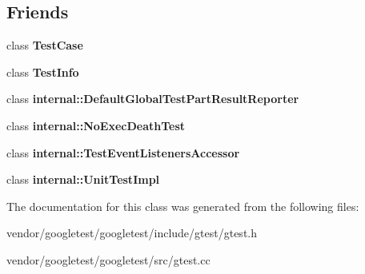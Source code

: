\subsection*{Friends}
\begin{DoxyCompactItemize}
\item 
\mbox{\label{classtesting_1_1_test_event_listeners_aff779e55b06adfa7c0088bd10253f0f0}} 
class {\bfseries Test\+Case}
\item 
\mbox{\label{classtesting_1_1_test_event_listeners_a4c49c2cdb6c328e6b709b4542f23de3c}} 
class {\bfseries Test\+Info}
\item 
\mbox{\label{classtesting_1_1_test_event_listeners_abae39633da9932847b41cb80efd62115}} 
class {\bfseries internal\+::\+Default\+Global\+Test\+Part\+Result\+Reporter}
\item 
\mbox{\label{classtesting_1_1_test_event_listeners_afddba49fdf3f493532b4d5efb9814f4e}} 
class {\bfseries internal\+::\+No\+Exec\+Death\+Test}
\item 
\mbox{\label{classtesting_1_1_test_event_listeners_addbc107b6b445617c880182bd4f44cf9}} 
class {\bfseries internal\+::\+Test\+Event\+Listeners\+Accessor}
\item 
\mbox{\label{classtesting_1_1_test_event_listeners_acc0a5e7573fd6ae7ad1878613bb86853}} 
class {\bfseries internal\+::\+Unit\+Test\+Impl}
\end{DoxyCompactItemize}


The documentation for this class was generated from the following files\+:\begin{DoxyCompactItemize}
\item 
vendor/googletest/googletest/include/gtest/gtest.\+h\item 
vendor/googletest/googletest/src/gtest.\+cc\end{DoxyCompactItemize}
